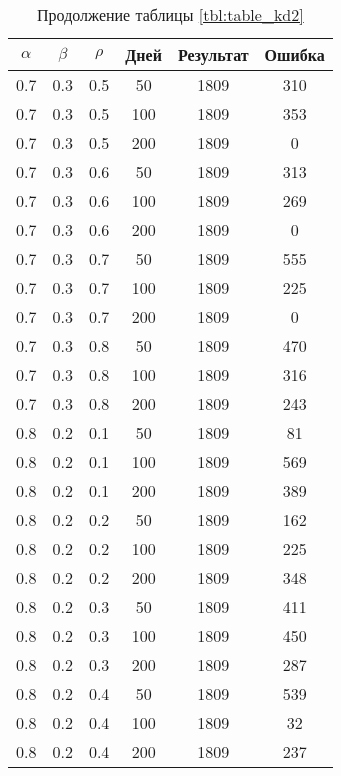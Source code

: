 \begin{table}[h]
	\begin{center}
        \begin{threeparttable}
        \captionsetup{justification=raggedright,singlelinecheck=off}
		\caption*{Продолжение таблицы \ref{tbl:table_kd2}}
		\begin{tabular}{|c|c|c|c|c|c|}
  	\hline
	$\alpha$ & $\beta$ & $\rho$ & Дней & Результат & Ошибка \\\hline
		0.7 &  0.3 &  0.5 &   50 &  1809 &   310 \\
		0.7 &  0.3 &  0.5 &  100 &  1809 &   353 \\
		0.7 &  0.3 &  0.5 &  200 &  1809 &     0 \\
	   \hline
		0.7 &  0.3 &  0.6 &   50 &  1809 &   313 \\
		0.7 &  0.3 &  0.6 &  100 &  1809 &   269 \\
		0.7 &  0.3 &  0.6 &  200 &  1809 &     0 \\
	   \hline
		0.7 &  0.3 &  0.7 &   50 &  1809 &   555 \\
		0.7 &  0.3 &  0.7 &  100 &  1809 &   225 \\
		0.7 &  0.3 &  0.7 &  200 &  1809 &     0 \\
	   \hline
		0.7 &  0.3 &  0.8 &   50 &  1809 &   470 \\
		0.7 &  0.3 &  0.8 &  100 &  1809 &   316 \\
		0.7 &  0.3 &  0.8 &  200 &  1809 &   243 \\
	   \hline
		0.8 &  0.2 &  0.1 &   50 &  1809 &    81 \\
		0.8 &  0.2 &  0.1 &  100 &  1809 &   569 \\
		0.8 &  0.2 &  0.1 &  200 &  1809 &   389 \\
	   \hline
		0.8 &  0.2 &  0.2 &   50 &  1809 &   162 \\
		0.8 &  0.2 &  0.2 &  100 &  1809 &   225 \\
		0.8 &  0.2 &  0.2 &  200 &  1809 &   348 \\
	   \hline
		0.8 &  0.2 &  0.3 &   50 &  1809 &   411 \\
		0.8 &  0.2 &  0.3 &  100 &  1809 &   450 \\
		0.8 &  0.2 &  0.3 &  200 &  1809 &   287 \\
	   \hline
		0.8 &  0.2 &  0.4 &   50 &  1809 &   539 \\
		0.8 &  0.2 &  0.4 &  100 &  1809 &    32 \\
		0.8 &  0.2 &  0.4 &  200 &  1809 &   237 \\

\end{tabular}
\end{threeparttable}
\end{center}
\end{table}
